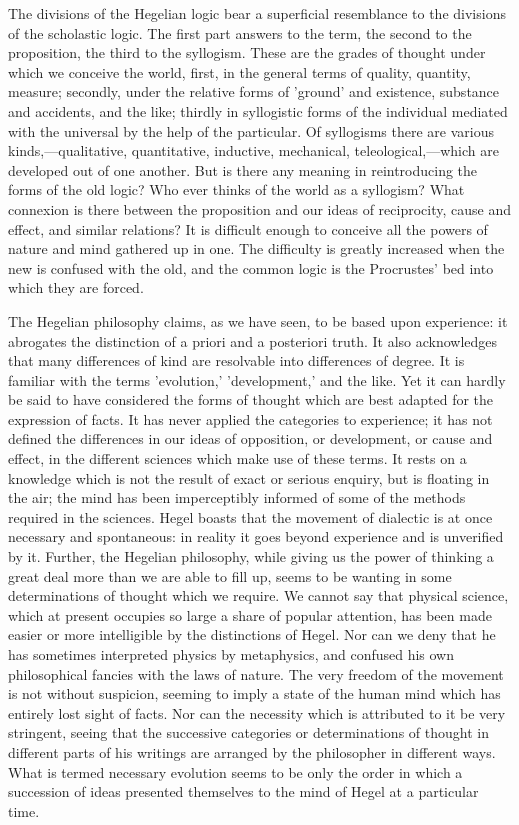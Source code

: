 \documentclass[11pt,letter]{article}
\begin{document}
\par  The divisions of the Hegelian logic bear a superficial resemblance to the divisions of the scholastic logic. The first part answers to the term, the second to the proposition, the third to the syllogism. These are the grades of thought under which we conceive the world, first, in the general terms of quality, quantity, measure; secondly, under the relative forms of 'ground' and existence, substance and accidents, and the like; thirdly in syllogistic forms of the individual mediated with the universal by the help of the particular. Of syllogisms there are various kinds,—qualitative, quantitative, inductive, mechanical, teleological,—which are developed out of one another. But is there any meaning in reintroducing the forms of the old logic? Who ever thinks of the world as a syllogism? What connexion is there between the proposition and our ideas of reciprocity, cause and effect, and similar relations? It is difficult enough to conceive all the powers of nature and mind gathered up in one. The difficulty is greatly increased when the new is confused with the old, and the common logic is the Procrustes' bed into which they are forced.

\par  The Hegelian philosophy claims, as we have seen, to be based upon experience: it abrogates the distinction of a priori and a posteriori truth. It also acknowledges that many differences of kind are resolvable into differences of degree. It is familiar with the terms 'evolution,' 'development,' and the like. Yet it can hardly be said to have considered the forms of thought which are best adapted for the expression of facts. It has never applied the categories to experience; it has not defined the differences in our ideas of opposition, or development, or cause and effect, in the different sciences which make use of these terms. It rests on a knowledge which is not the result of exact or serious enquiry, but is floating in the air; the mind has been imperceptibly informed of some of the methods required in the sciences. Hegel boasts that the movement of dialectic is at once necessary and spontaneous: in reality it goes beyond experience and is unverified by it. Further, the Hegelian philosophy, while giving us the power of thinking a great deal more than we are able to fill up, seems to be wanting in some determinations of thought which we require. We cannot say that physical science, which at present occupies so large a share of popular attention, has been made easier or more intelligible by the distinctions of Hegel. Nor can we deny that he has sometimes interpreted physics by metaphysics, and confused his own philosophical fancies with the laws of nature. The very freedom of the movement is not without suspicion, seeming to imply a state of the human mind which has entirely lost sight of facts. Nor can the necessity which is attributed to it be very stringent, seeing that the successive categories or determinations of thought in different parts of his writings are arranged by the philosopher in different ways. What is termed necessary evolution seems to be only the order in which a succession of ideas presented themselves to the mind of Hegel at a particular time.
\end{document}
